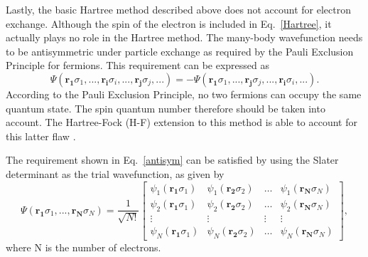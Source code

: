 \documentclass[11pt, twoside]{report}
\begin{document}
Lastly, the basic Hartree method described above does not account for electron exchange. Although the spin of the electron is included in Eq.~\ref{Hartree}, it actually plays no role in the Hartree method. The many-body wavefunction needs to be antisymmetric under particle exchange as required by the Pauli Exclusion Principle for fermions. This requirement can be expressed as
\begin{equation}\label{antisym}
\Psi(\boldsymbol{r_1}\sigma_1, ..., \boldsymbol{r_i}\sigma_i, ..., \mathbf{r_j}\sigma_j, ...) = - \Psi(\boldsymbol{r_1}\sigma_1, ..., \boldsymbol{r_j}\sigma_j, ..., \boldsymbol{r_i}\sigma_i, ...) .
\end{equation}
According to the Pauli Exclusion Principle, no two fermions can occupy the same quantum state. The spin quantum number therefore should be taken into account. The Hartree-Fock (H-F) extension to this method is able to account for this latter flaw \cite{Prasad_ch2}.

The requirement shown in Eq.~\ref{antisym} can be satisfied by using the Slater determinant as the trial wavefunction, as given by
\begin{equation}\label{Slater_det}
\Psi(\boldsymbol{r_1}\sigma_1, ..., \boldsymbol{r_N}\sigma_N) = \frac{1}{\sqrt{N!}} \begin{bmatrix}
\psi_1(\boldsymbol{r_1}\sigma_1) & \psi_1(\boldsymbol{r_2}\sigma_2) & \dots & \psi_1(\boldsymbol{r_N}\sigma_N) \\
\psi_2(\boldsymbol{r_1}\sigma_1) & \psi_2(\boldsymbol{r_2}\sigma_2) & \dots & \psi_2(\boldsymbol{r_N}\sigma_N) \\
\vdots & \vdots & \vdots & \vdots \\
\psi_N(\boldsymbol{r_1}\sigma_1) & \psi_N(\boldsymbol{r_2}\sigma_2) & \dots & \psi_N(\boldsymbol{r_N}\sigma_N) 
\end{bmatrix} ,
\end{equation}
where N is the number of electrons.
\end{document}
